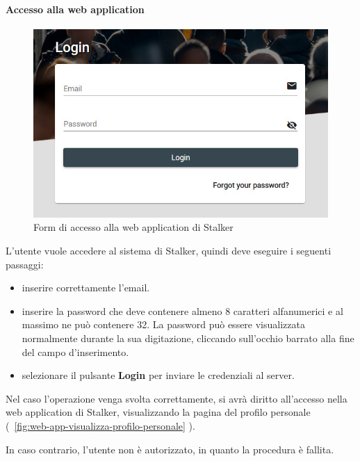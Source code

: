 \documentclass[../manuale-utente.tex]{subfiles}
\begin{document}
\paragraph{Accesso alla web application}%
\label{par:accesso_alla_web_application}

\begin{figure}[H]
    \centering
    \includegraphics[width=120mm]{img/web-app/accesso-web-app.png}
    \caption{Form di accesso alla web application di Stalker}%
    \label{fig:web_app_form_accesso}
\end{figure}

L'utente vuole accedere al sistema di Stalker, quindi deve eseguire i seguenti passaggi:
\begin{itemize}
    \item inserire correttamente l'email.
    \item inserire la password che deve contenere almeno 8 caratteri alfanumerici e al massimo ne può contenere 32. La password può essere visualizzata normalmente durante la sua digitazione, cliccando sull'occhio barrato alla fine del campo d'inserimento.
    \item selezionare il pulsante \textbf{Login} per inviare le credenziali al server.
\end{itemize} 

Nel caso l'operazione venga svolta correttamente, si avrà diritto all'accesso nella web application di Stalker, visualizzando la pagina del profilo personale (~\ref{fig:web-app-visualizza-profilo-personale} ).

In caso contrario, l'utente non è autorizzato, in quanto la procedura è fallita.
\end{document}
